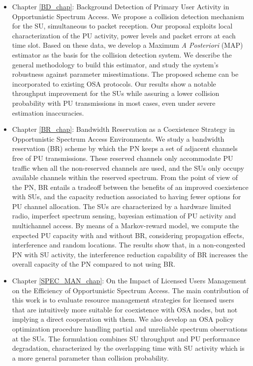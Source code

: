 \begin{itemize}
\item Chapter \ref{BD_chap}: Background Detection of Primary User Activity in Opportunistic Spectrum Access. 
We propose a collision detection mechanism for the SU, simultaneous to packet reception. 
Our proposal exploits local characterization of the PU activity, power levels and packet errors at each time slot. 
Based on these data, we develop a Maximum \textit{A Posteriori} (MAP) estimator as the basis for the collision detection system. We describe the general methodology to build this estimator, and study the system's robustness against parameter misestimations. 
The proposed scheme can be incorporated to existing OSA protocols. 
Our results show a notable throughput improvement for the SUs while assuring a lower collision probability with PU transmissions in most cases, even under severe estimation inaccuracies.
\item Chapter \ref{BR_chap}: Bandwidth Reservation as a Coexistence Strategy in Opportunistic Spectrum Access Environments. We study a bandwidth reservation (BR) scheme by which the PN keeps a set of adjacent channels free of PU transmissions. 
These reserved channels only accommodate PU traffic when all the non-reserved channels are used, and the SUs only occupy available channels within the reserved spectrum.
From the point of view of the PN, BR entails a tradeoff between the benefits of an improved coexistence with SUs, and the capacity reduction associated to having fewer options for PU channel allocation.
The SUs are characterized by a hardware limited radio, imperfect spectrum sensing, bayesian estimation of PU activity and multichannel access. 
By means of a Markov-reward model, we compute the expected PU capacity with and without BR, considering propagation effects, interference and random locations.
The results show that, in a non-congested PN with SU activity, the interference reduction capability of BR increases the overall capacity of the PN compared to not using BR.
\item Chapter \ref{SPEC_MAN_chap}: On the Impact of Licensed Users Management on the Efficiency of Opportunistic Spectrum Access.
The main contribution of this work is to evaluate resource management strategies for licensed users that are intuitively more suitable for coexistence with OSA nodes, but not implying a direct cooperation with them.
We also develop an OSA policy optimization procedure handling partial and unreliable spectrum observations at the SUs.
The formulation combines SU throughput and PU performance degradation, characterized by the overlapping time with SU activity which is a more general parameter than collision probability.    

\end{itemize}
